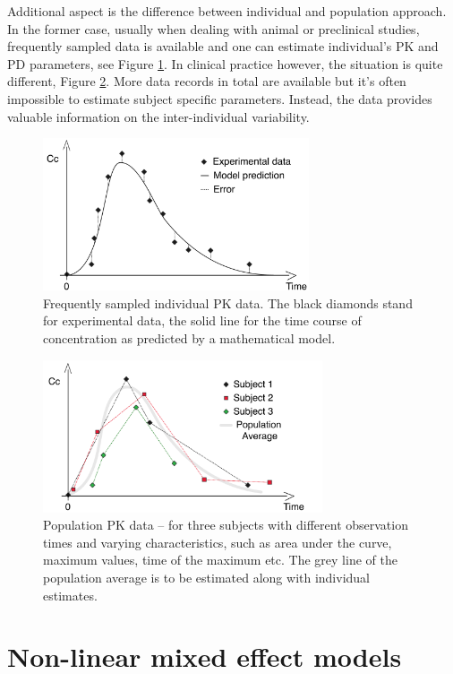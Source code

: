 Additional aspect is the difference between individual and population approach. 
In the former case, usually when dealing with animal or preclinical studies, 
frequently sampled data is available and one can estimate individual's PK and 
PD parameters, see Figure \ref{fig:indivModel}. In clinical practice however, 
the situation is quite different, Figure \ref{fig:popModel}. More data records 
in total are available but it's often impossible to estimate subject specific 
parameters. Instead, the data provides valuable information on the inter-individual 
variability. 
\begin{figure}[htbp]
\centering
 \includegraphics[height=45mm]{pics/Model-individual}
\caption{Frequently sampled individual PK data. The black diamonds stand 
for experimental data, the solid line for the time course of concentration as 
predicted by a mathematical model. }
\label{fig:indivModel}
\end{figure}

\begin{figure}[htbp]
\centering
 \includegraphics[height=45mm]{pics/Model-population}
\caption{Population PK data --  for three subjects with different observation times 
and varying characteristics, such as area under the curve, maximum values, 
time of the maximum etc. The grey line of the population average is to be 
estimated along with individual estimates.}
\label{fig:popModel}
\end{figure}

\section{Non-linear mixed effect models} 

